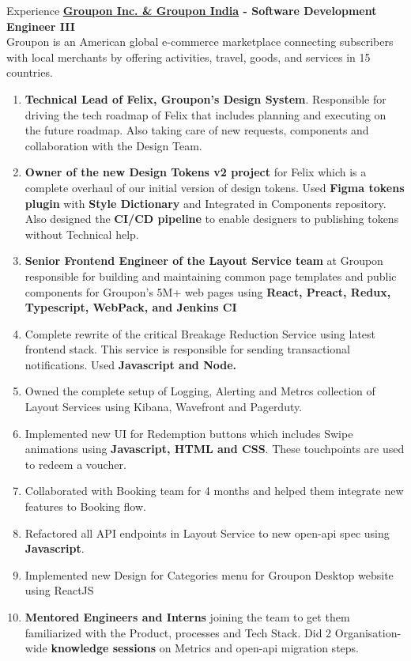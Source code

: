 \documentclass{resume} %
\begin{document}
\begin{rSection}{Experience}
{\bf \href{http://groupon.com}{Groupon Inc. \& Groupon India} -  Software Development Engineer III \hfill{}}
\\Groupon is an American global e-commerce marketplace connecting subscribers with local merchants by offering activities, travel, goods, and services in 15 countries.
 \begin{enumerate}
        \item \textbf{Technical Lead of {Felix, Groupon's Design System}}. Responsible for driving the tech roadmap of Felix that includes planning and executing on the future roadmap. Also taking care of new requests, components and collaboration with the Design Team.
        \item \textbf{Owner of the new Design Tokens v2 project} for Felix which is a complete overhaul of our initial version of design tokens. Used \textbf{Figma tokens plugin }with \textbf{Style Dictionary} and Integrated in Components repository. Also designed the \textbf{CI/CD pipeline} to enable designers to publishing tokens without Technical help.
		\item \textbf{Senior Frontend Engineer of the Layout Service team} at Groupon responsible for building and maintaining common page templates and public components for Groupon’s 5M+ web pages using \textbf{React, Preact, Redux, Typescript, WebPack, and Jenkins CI}
        \item Complete rewrite of the critical Breakage Reduction Service using latest frontend stack. This service is responsible for sending transactional notifications. Used \textbf{Javascript and Node.}
				\item Owned the complete setup of Logging, Alerting and Metrcs collection of Layout Services using Kibana, Wavefront and Pagerduty.
        \item Implemented new UI for Redemption buttons which includes Swipe animations using \textbf{Javascript, HTML and CSS}. These touchpoints are used to redeem a voucher.
        \item Collaborated with Booking team for 4 months and helped them integrate new features to Booking flow.
        \item Refactored all API endpoints in Layout Service to new open-api spec using \textbf{Javascript}.
        \item Implemented new Design for Categories menu for Groupon Desktop website using ReactJS
    \item \textbf{Mentored Engineers and Interns} joining the team to get them familiarized with the Product, processes and Tech Stack. Did 2 Organisation-wide \textbf{knowledge sessions} on Metrics and open-api migration steps.
   \end{enumerate}


\end{rSection}
\end{document}

